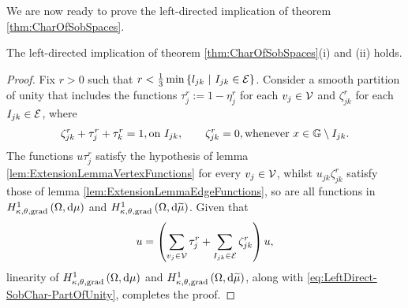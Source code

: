 We are now ready to prove the left-directed implication of theorem \ref{thm:CharOfSobSpaces}.
\begin{theorem} \label{thm:LeftDirect-SobChar}
	The left-directed implication of theorem \ref{thm:CharOfSobSpaces}(i) and (ii) holds.
\end{theorem}
\begin{proof}
	Fix $r>0$ such that $r<\frac{1}{3}\min\left\{ l_{jk} \ \middle\vert \  I_{jk}\in\mathcal{E} \right\}$.
	Consider a smooth partition of unity that includes the functions $\tau_j^r := 1-\eta_j^r$ for each $v_j\in\mathcal{V}$ and $\zeta_{jk}^r$ for each $I_{jk}\in\mathcal{E}$, where
	\begin{align} \label{eq:LeftDirect-SobChar-PartOfUnity}
		\zeta_{jk}^r + \tau_j^r + \tau_k^r = 1, \text{on } I_{jk}, 
		\qquad
		\zeta_{jk}^r = 0, \text{whenever } x\in\mathbb{G}\setminus I_{jk}.
	\end{align}
	The functions $u\tau_j^r$ satisfy the hypothesis of lemma \ref{lem:ExtensionLemmaVertexFunctions} for every $v_j\in\mathcal{V}$, whilst $u_{jk}\zeta_{jk}^r$ satisfy those of lemma \ref{lem:ExtensionLemmaEdgeFunctions}, so are all functions in $H^1_{\kappa,\theta,\mathrm{grad}}\left( \Omega, \mathrm{d}\mu \right)$ and $H^1_{\kappa,\theta,\mathrm{grad}}\left( \Omega, \mathrm{d}\widetilde{\mu} \right)$.
	Given that
	\begin{align*}
		u = \left(  \sum_{v_j\in\mathcal{V}} \tau_j^r + \sum_{I_{jk}\in\mathcal{E}} \zeta_{jk}^r  \right)u,
	\end{align*}
	linearity of $H^1_{\kappa,\theta,\mathrm{grad}}\left( \Omega, \mathrm{d}\mu \right)$ and $H^1_{\kappa,\theta,\mathrm{grad}}\left( \Omega, \mathrm{d}\widetilde{\mu} \right)$, along with \eqref{eq:LeftDirect-SobChar-PartOfUnity}, completes the proof.
\end{proof}
